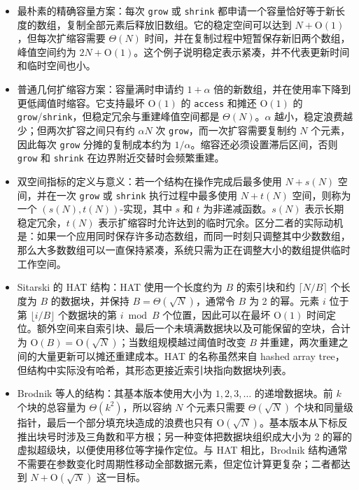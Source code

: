 \documentclass[UTF8,11pt,a4paper]{ctexart}
\newcommand{\op}[1]{\textnormal{\texttt{#1}}}
\newcommand{\Oh}{\mathrm{O}}
\newcommand{\Th}{\Theta}
\begin{document}
\begin{itemize}
  \item 最朴素的精确容量方案：每次 \op{grow} 或 \op{shrink} 都申请一个容量恰好等于新长度的数组，复制全部元素后释放旧数组。它的稳定空间可以达到 $N+\Oh(1)$，但每次扩缩容需要 $\Th(N)$ 时间，并在复制过程中短暂保存新旧两个数组，峰值空间约为 $2N+\Oh(1)$。这个例子说明稳定表示紧凑，并不代表更新时间和临时空间也小。

  \item 普通几何扩缩容方案：容量满时申请约 $1+\alpha$ 倍的新数组，并在使用率下降到更低阈值时缩容。它支持最坏 $\Oh(1)$ 的 \op{access} 和摊还 $\Oh(1)$ 的 \op{grow}/\op{shrink}，但稳定冗余与重建峰值空间都是 $\Th(N)$。$\alpha$ 越小，稳定浪费越少；但两次扩容之间只有约 $\alpha N$ 次 \op{grow}，而一次扩容需要复制约 $N$ 个元素，因此每次 \op{grow} 分摊的复制成本约为 $1/\alpha$。缩容还必须设置滞后区间，否则 \op{grow} 和 \op{shrink} 在边界附近交替时会频繁重建。

  \item 双空间指标的定义与意义：若一个结构在操作完成后最多使用 $N+s(N)$ 空间，并在一次 \op{grow} 或 \op{shrink} 执行过程中最多使用 $N+t(N)$ 空间，则称为一个 $(s(N),t(N))$-实现，其中 $s$ 和 $t$ 为非递减函数。$s(N)$ 表示长期稳定冗余，$t(N)$ 表示扩缩容时允许达到的临时冗余。区分二者的实际动机是：如果一个应用同时保存许多动态数组，而同一时刻只调整其中少数数组，那么大多数数组可以一直保持紧凑，系统只需为正在调整大小的数组提供临时工作空间。

  \item Sitarski 的 HAT 结构：HAT 使用一个长度约为 $B$ 的索引块和约 $\lceil N/B\rceil$ 个长度为 $B$ 的数据块，并保持 $B=\Th(\sqrt{N})$，通常令 $B$ 为 2 的幂。元素 $i$ 位于第 $\lfloor i/B\rfloor$ 个数据块的第 $i\bmod B$ 个位置，因此可以在最坏 $\Oh(1)$ 时间定位。额外空间来自索引块、最后一个未填满数据块以及可能保留的空块，合计为 $\Oh(B)=\Oh(\sqrt{N})$；当数组规模越过阈值时改变 $B$ 并重建，两次重建之间的大量更新可以摊还重建成本。HAT 的名称虽然来自 hashed array tree，但结构中实际没有哈希，其形态更接近索引块指向数据块列表。

  \item Brodnik 等人的结构：其基本版本使用大小为 $1,2,3,\ldots$ 的递增数据块。前 $k$ 个块的总容量为 $\Th(k^2)$，所以容纳 $N$ 个元素只需要 $\Th(\sqrt{N})$ 个块和同量级指针，最后一个部分填充块造成的浪费也只有 $\Oh(\sqrt{N})$。基本版本从下标反推出块号时涉及三角数和平方根；另一种变体把数据块组织成大小为 2 的幂的虚拟超级块，以便使用移位等字操作定位。与 HAT 相比，Brodnik 结构通常不需要在参数变化时周期性移动全部数据元素，但定位计算更复杂；二者都达到 $N+\Oh(\sqrt{N})$ 这一目标。


\end{itemize}
\end{document}
